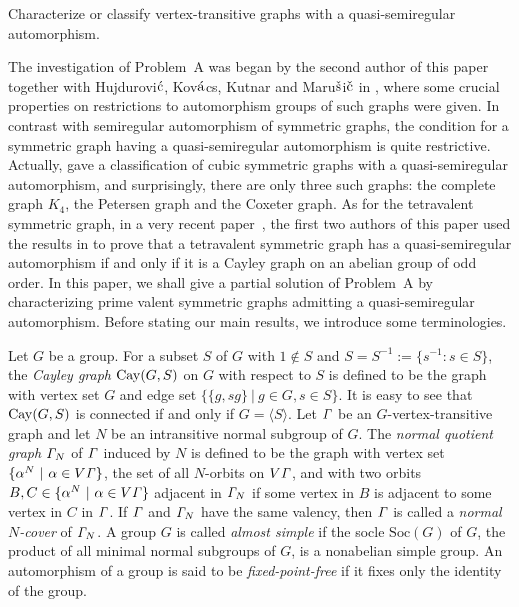 \documentclass[12pt,reqno]{amsart}
\def\soc{ \mathrm{Soc}}
\numberwithin {equation} {section}
\begin{document}
\vspace{0.2cm}
 Characterize or classify vertex-transitive graphs with a quasi-semiregular automorphism.

The investigation of Problem~A was began by the second author of this paper together with Hujdurovi$\acute{\rm c}$, Kov$\acute{\rm a}$cs, Kutnar and Maru$\check{\rm s}$i$\check{\rm c}$ in \cite{FengHKKM}, where some crucial properties on restrictions to automorphism groups of such graphs were given. In contrast with semiregular automorphism of symmetric graphs, the condition for a symmetric graph having a quasi-semiregular automorphism is quite restrictive. Actually, \cite[Theorem 1.1]{FengHKKM} gave a classification of cubic symmetric graphs with a quasi-semiregular automorphism, and surprisingly, there are only three such graphs: the complete graph $K_4$, the Petersen graph and the Coxeter graph. As for the tetravalent symmetric graph, in a very recent paper~\cite{YF}, the first two authors of this paper used the results in \cite{FengHKKM} to prove that a tetravalent symmetric graph has a quasi-semiregular automorphism if and only if it is a Cayley graph on an abelian group of odd order. In this paper, we shall give a partial solution of Problem~A by characterizing prime valent symmetric graphs admitting a quasi-semiregular automorphism. Before stating our main results, we introduce some terminologies.

Let $G$ be a group. For a subset $S$ of $G$ with $1\not\in S$ and $S=S^{-1}:=\{s^{-1}: s \in S\}$, the \emph{Cayley graph} $\mathrm{Cay}(G,S)$ on $G$ with respect to $S$ is defined to be the graph with vertex set $G$ and edge set $\{\{g,sg\}\ |\ g \in G,s \in S\}$. It is easy to see that $\mathrm{Cay}(G,S)$ is connected if and only if $G=\langle S\rangle$.
Let ${\it \Gamma}$ be an $G$-vertex-transitive graph and let $N$ be an intransitive normal subgroup of $G$. The {\it normal quotient graph } ${\it \Gamma}_ N$ of ${\it \Gamma}$ induced by $N$ is defined to be the graph with vertex set $\{ \alpha^N\ |\ \alpha \in V{\it \Gamma} \}$, the set of all $N$-orbits on $V{\it \Gamma}$, and with two orbits $B , C \in \{ \alpha^N\ |\ \alpha \in V{\it \Gamma} \}$  adjacent in ${\it \Gamma}_N$ if some vertex in $B$ is adjacent to some vertex in $C$ in ${\it \Gamma}$. If ${\it \Gamma}$ and ${\it \Gamma}_N$ have the same valency, then ${\it \Gamma}$ is called a \emph{normal $N$-cover} of  ${\it \Gamma}_N$. A group $G$ is called \emph{almost simple} if the socle $\soc(G)$ of $G$, the product of all minimal normal subgroups of $G$, is a nonabelian simple group. An automorphism of a group is said to be \emph{fixed-point-free} if it fixes only the identity of the group.
\end{document}

